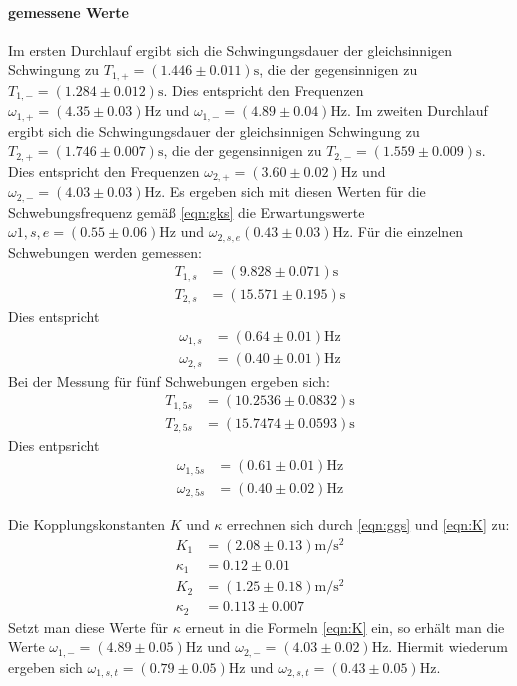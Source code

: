 \paragraph{gemessene Werte}
Im ersten Durchlauf ergibt sich die Schwingungsdauer der gleichsinnigen Schwingung zu $T_{1,+} = (1.446 \pm 0.011)\si{\second}$, die der gegensinnigen zu $T_{1,-} = (1.284 \pm 0.012)\si{\second}$. Dies entspricht den Frequenzen $\omega_{1,+} = (4.35 \pm 0.03)\si{\hertz}$ und $\omega_{1,-} = (4.89 \pm 0.04)\si{\hertz}$.
Im zweiten Durchlauf ergibt sich die Schwingungsdauer der gleichsinnigen Schwingung zu $T_{2,+} = (1.746 \pm 0.007)\si{\second}$, die der gegensinnigen zu $T_{2,-} = (1.559 \pm 0.009)\si{\second}$. Dies entspricht den Frequenzen $\omega_{2,+} = (3.60 \pm 0.02)\si{\hertz}$ und $\omega_{2,-} = (4.03 \pm 0.03)\si{\hertz}$.
Es ergeben sich mit diesen Werten für die Schwebungsfrequenz gemäß \eqref{eqn:gks} die Erwartungswerte $\omega{1,s,e} = (0.55 \pm 0.06) \si{\hertz}$ und $\omega_{2,s,e}(0.43 \pm 0.03) \si{\hertz}$.
Für die einzelnen Schwebungen werden gemessen:
\begin{align*}
  T_{1,s} &= (9.828 \pm 0.071) \si{\second} \\
  T_{2,s} &= (15.571 \pm 0.195) \si{\second}
\end{align*}
Dies entspricht
\begin{align*}
  \omega_{1,s} &= (0.64 \pm 0.01) \si{\hertz} \\
  \omega_{2,s} &= (0.40 \pm 0.01) \si{\hertz}
\end{align*}
Bei der Messung für fünf Schwebungen ergeben sich:
\begin{align*}
  T_{1,5s} &= (10.2536 \pm 0.0832) \si{\second}\\
  T_{2,5s} &= (15.7474 \pm 0.0593) \si{\second}
\end{align*}
Dies entpsricht
\begin{align*}
  \omega_{1,5s} &= (0.61 \pm 0.01) \si{\hertz}\\
  \omega_{2,5s} &= (0.40 \pm 0.02) \si{\hertz}
\end{align*}

Die Kopplungskonstanten $K$ und $\kappa$ errechnen sich durch \eqref{eqn:ggs} und \eqref{eqn:K} zu:
\begin{align*}
  K_{1} &= (2.08 \pm 0.13) \si{\meter\per\second\squared} \\
  \kappa_{1} &= 0.12 \pm 0.01\\
  K_{2} &= (1.25 \pm 0.18) \si{\meter\per\second\squared}\\
  \kappa_{2} &= 0.113 \pm 0.007
\end{align*}
Setzt man diese Werte für $\kappa$ erneut in die Formeln \eqref{eqn:K} ein, so erhält man die Werte $\omega_{1,-} = (4.89 \pm 0.05) \si{\hertz}$ und $\omega_{2,-} = (4.03 \pm 0.02)\si{\hertz}$. Hiermit wiederum ergeben sich $\omega_{1,s,t} = (0.79 \pm 0.05) \si{\hertz}$ und $\omega_{2,s,t} = (0.43 \pm 0.05) \si{\hertz}$.
